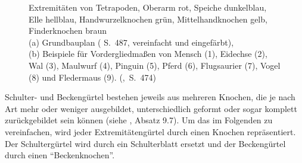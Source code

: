  \begin{figure}
   \label{grundbauplan}
  \qquad
   \label{bsp_extremitaeten}
  
  \caption{Extremitäten von Tetrapoden, Oberarm rot, Speiche dunkelblau, Elle hellblau, Handwurzelknochen grün, Mittelhandknochen gelb, Finderknochen braun\\
  (a) Grundbauplan (\cite{AllgemeineZoologie} S.\ 487, vereinfacht und eingefärbt),\\
  (b) Beispiele für Vordergliedmaßen von Mensch (1), Eidechse (2), Wal (3), Maulwurf (4), Pinguin (5), Pferd (6), Flugsaurier (7), Vogel (8) und Fledermaus (9). \mbox{(\cite{dtvBiologie}, S.\ 474)}}
  \label{extremities}
 \end{figure}

Schulter- und Beckengürtel bestehen  jeweils aus mehreren Knochen, die je nach Art mehr oder weniger ausgebildet, unterschiedlich geformt oder sogar komplett zurückgebildet sein können (siehe \cite{Vergleichende_Anatomie}, Absatz 9.7). Um das im Folgenden zu vereinfachen, wird jeder Extremitätengürtel durch einen Knochen repräsentiert. Der Schultergürtel wird durch ein Schulterblatt ersetzt und der Beckengürtel durch einen "`Beckenknochen"'.

